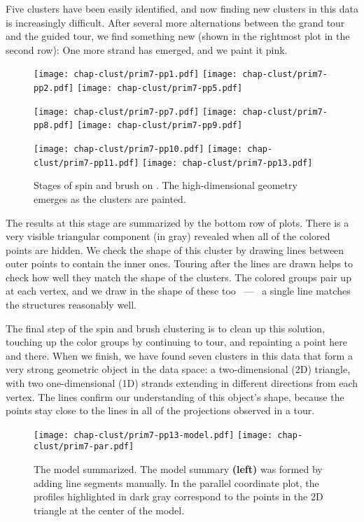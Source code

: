 Five clusters have been easily identified, and now finding new
clusters in this data is increasingly difficult. After several more
alternations between the grand tour and the guided tour, we find
something new (shown in the rightmost plot in the second row): One
more strand has emerged, and we paint it pink.

\begin{figure}[htp]
\centerline{{\texttt{[image: chap-clust/prim7-pp1.pdf]}}
 {\texttt{[image: chap-clust/prim7-pp2.pdf]}}
 {\texttt{[image: chap-clust/prim7-pp5.pdf]}}}
\smallskip
\centerline{{\texttt{[image: chap-clust/prim7-pp7.pdf]}}
 {\texttt{[image: chap-clust/prim7-pp8.pdf]}}
 {\texttt{[image: chap-clust/prim7-pp9.pdf]}}}
\centerline{{\texttt{[image: chap-clust/prim7-pp10.pdf]}}
  {\texttt{[image: chap-clust/prim7-pp11.pdf]}}
  {\texttt{[image: chap-clust/prim7-pp13.pdf]}}}
\caption[Stages of ``spin and brush'' on ]{Stages of spin
and brush on .  The high-dimensional geometry emerges as
the clusters are painted.}
\label{prim7-tour}
\end{figure}

The results at this stage are summarized by the bottom row of plots.
There is a very visible triangular component (in gray) revealed when
all of the colored points are hidden. We check the shape of this
cluster by drawing lines between outer points to contain the inner
ones. Touring after the lines are drawn helps to check how well they
match the shape of the clusters. The colored groups pair up at each
vertex, and we draw in the shape of these too ~---~ a single line
matches the structures reasonably well.

The final step of the spin and brush clustering is to clean up this
solution, touching up the color groups by continuing to tour, and
repainting a point here and there.  When we finish, we have found
seven clusters in this data that form a very strong geometric object
in the data space: a two-dimensional (2D) triangle, with two
one-dimensional (1D) strands extending in different directions from
each vertex.  The lines confirm our understanding of this object's
shape, because the points stay close to the lines in all of the
projections observed in a tour.

\begin{figure}
\centerline{
   \texttt{[image: chap-clust/prim7-pp13-model.pdf]}
   \texttt{[image: chap-clust/prim7-par.pdf]}
}
\caption[The  model summarized]{The  model
summarized.  The model summary {\bf (left)} was formed by adding line
segments manually.  In the parallel coordinate plot, the profiles
highlighted in dark gray correspond to the points in the 2D triangle
at the center of the model.  }
\label{prim7-model}
\end{figure}

